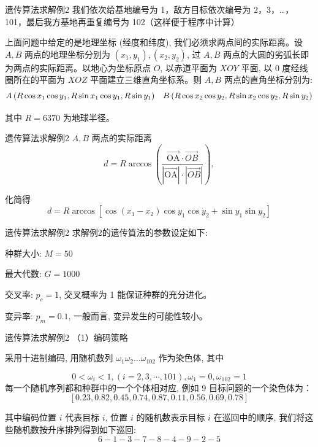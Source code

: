 \documentclass[xcolor=table,dvipsnames,svgnames,aspectratio=169,fontset=ubuntu]{ctexbeamer}
\let\\\relax
\begin{document}
\begin{frame}{遗传算法求解例2}
  我们依次给基地编号为 1，敌方目标依次编号为 2，3，…，101，最后我方基地再重复编号为 102（这样便于程序中计算）

  \vskip 10pt
  上面问题中给定的是地理坐标 (经度和纬度), 我们必须求两点间的实际距离。设 $A, B$ 两点的地理坐标分别为 $\left(x_1, y_1\right),\left(x_2, y_2\right)$, 过 $A, B$ 两点的大圆的劣弧长即为两点的实际距离。以地心为坐标原点 $O$, 以赤道平面为 $X O Y$ 平面, 以 0 度经线圈所在的平面为 $X O Z$ 平面建立三维直角坐标系。则 $A, B$ 两点的直角坐标分别为:
  $$
  \begin{aligned}
  & A\left(R \cos x_1 \cos y_1, R \sin x_1 \cos y_1, R \sin y_1\right) \\
  & B\left(R \cos x_2 \cos y_2, R \sin x_2 \cos y_2, R \sin y_2\right)
  \end{aligned}
  $$
  
  其中 $R=6370$ 为地球半径。
\end{frame}

\begin{frame}{遗传算法求解例2}
  $A, B$ 两点的实际距离
$$
d=R \arccos \left(\frac{\overrightarrow{\mathrm{OA}} \cdot \overrightarrow{O B}}{|\overrightarrow{\mathrm{OA}}| \cdot|\overrightarrow{O B}|}\right),
$$

化简得
$$
d=R \arccos \left[\cos \left(x_1-x_2\right) \cos y_1 \cos y_2+\sin y_1 \sin y_2\right] 
$$
\end{frame}

\begin{frame}{遗传算法求解例2}
  求解例2的遗传筫法的参数设定如下:

  \vskip 8pt
  种群大小: $M=50$

  \vskip 8pt
  最大代数: $G=1000$

  \vskip 8pt
  交叉率: $p_c=1$, 交叉概率为 1 能保证种群的充分进化。

  \vskip 8pt
  变异率: $p_m=0.1$, 一般而言, 变异发生的可能性较小。
\end{frame}

\begin{frame}{遗传算法求解例2}
  （1）编码策略

  \vskip 5pt
  采用十进制编码, 用随机数列 $\omega_1 \omega_2 \ldots \omega_{102}$ 作为染色体, 其中 
  
  $$0<\omega_i<1,(i=2,3, \cdots, 101), \omega_1=0, \omega_{102}=1$$
  \vskip 5pt
  每一个随机序列都和种群中的一个个体相对应, 例如 9 目标问题的一个染色体为：
  $$
  [0.23,0.82,0.45,0.74,0.87,0.11,0.56,0.69,0.78]
  $$
  
  其中编码位置 $i$ 代表目标 $i$, 位置 $i$ 的随机数表示目标 $i$ 在巡回中的顺序, 我们将这些随机数按升序排列得到如下巡回:
  $$
  6-1-3-7-8-4-9-2-5
  $$
\end{frame}
\end{document}
